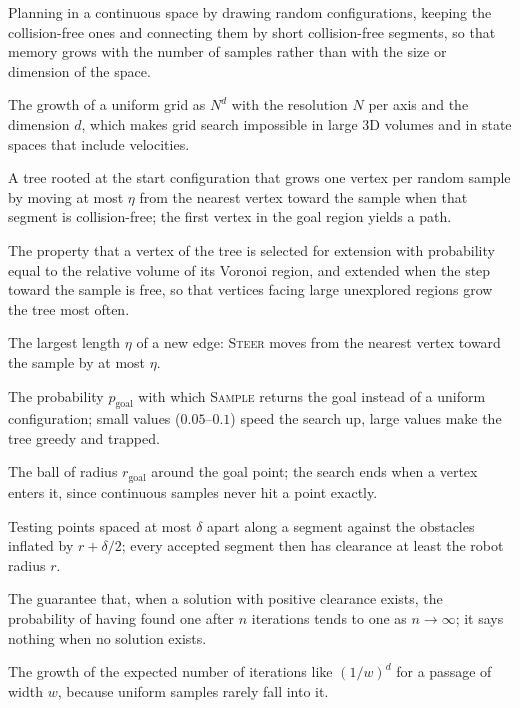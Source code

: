 \item[Sampling-based planning] Planning in a continuous space by drawing random configurations, keeping the collision-free ones and connecting them by short collision-free segments, so that memory grows with the number of samples rather than with the size or dimension of the space.
\item[Curse of dimensionality] The growth of a uniform grid as $N^{d}$ with the resolution $N$ per axis and the dimension $d$, which makes grid search impossible in large 3D volumes and in state spaces that include velocities.
\item[Rapidly-exploring random tree (RRT)] A tree rooted at the start configuration that grows one vertex per random sample by moving at most $\eta$ from the nearest vertex toward the sample when that segment is collision-free; the first vertex in the goal region yields a path.
\item[Voronoi bias] The property that a vertex of the tree is selected for extension with probability equal to the relative volume of its Voronoi region, and extended when the step toward the sample is free, so that vertices facing large unexplored regions grow the tree most often.
\item[Step size] The largest length $\eta$ of a new edge: \textsc{Steer} moves from the nearest vertex toward the sample by at most $\eta$.
\item[Goal bias] The probability $p_{\mathrm{goal}}$ with which \textsc{Sample} returns the goal instead of a uniform configuration; small values ($0.05$--$0.1$) speed the search up, large values make the tree greedy and trapped.
\item[Goal region] The ball of radius $r_{\mathrm{goal}}$ around the goal point; the search ends when a vertex enters it, since continuous samples never hit a point exactly.
\item[Collision checking by subdivision] Testing points spaced at most $\delta$ apart along a segment against the obstacles inflated by $r+\delta/2$; every accepted segment then has clearance at least the robot radius $r$.
\item[Probabilistic completeness] The guarantee that, when a solution with positive clearance exists, the probability of having found one after $n$ iterations tends to one as $n\to\infty$; it says nothing when no solution exists.
\item[Narrow-passage problem] The growth of the expected number of iterations like $(1/w)^{d}$ for a passage of width $w$, because uniform samples rarely fall into it.

